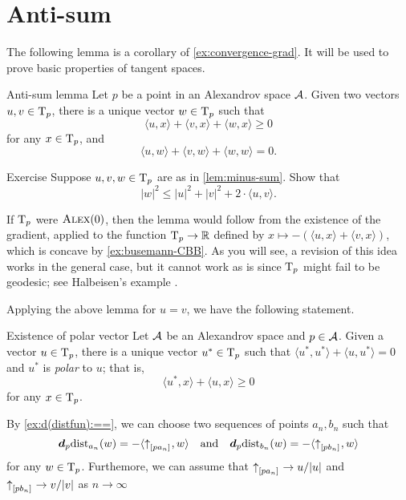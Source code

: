 \section{Anti-sum}

The following lemma is a corollary of \ref{ex:convergence-grad}.
It will be used to prove basic properties of tangent spaces.


\begin{thm}{Anti-sum lemma}\label{lem:minus-sum} 
Let $p$ be a point in an Alexandrov space $\mathcal{A}$.
Given two vectors $u,v\in \mathrm{T}_p$, there is a unique vector $w\in \mathrm{T}_p$ such that
\[\langle u,x\rangle +\langle v,x\rangle +\langle w,x\rangle \ge 0\]
for any $x\in \mathrm{T}_p$, and
\[\langle u,w\rangle +\langle v,w\rangle +\langle w,w\rangle =0.\]

\end{thm}

\begin{thm}[!]{Exercise}\label{ex:|antisum|}
Suppose $u,v, w\in \mathrm{T}_p$ are as in \ref{lem:minus-sum}.
Show that 
\[|w|^2\le |u|^2+|v|^2+2\cdot\langle u,v\rangle.\]

\end{thm}

If $\mathrm{T}_p$ were $\textsc{Alex}(0)$, then the lemma would follow from the existence  of the gradient, applied to the function $\mathrm{T}_p\to \mathbb{R}$ defined by $x\mapsto -(\langle u,x\rangle +\langle v,x\rangle )$, which is concave by \ref{ex:busemann-CBB}.
As you will see, a revision of this idea works in the general case, but it cannot work as is since $\mathrm{T}_p$ might fail to be geodesic; see Halbeisen's example \cite[13.6]{alexander-kapovitch-petrunin2024}.

Applying the above lemma for $u=v$, we have the following statement.

\begin{thm}{Existence of polar vector}\label{cor:polar}
Let $\mathcal{A}$ be an Alexandrov space 
and $p\in \mathcal{A}$. 
Given a vector $u\in \mathrm{T}_p$,  there is a unique vector $u^*\in\mathrm{T}_p$ such that $\langle u^*,u^*\rangle +\langle u,u^*\rangle = 0$ and
$u^*$ is \emph{polar} to $u$;
that is,
\[\langle u^*,x\rangle +\langle u,x\rangle \ge 0\]
for any $x\in \mathrm{T}_p$.
\end{thm}

By \ref{ex:d(distfun):==}, we can choose two sequences of points $a_n,b_n$ such that 
\[
\bm{d}_p\mathrm{dist}_{a_n}(w)=-\langle{\uparrow}_{[{p}{a_n}]_{{}}},w\rangle
\quad\text{and}\quad
\bm{d}_p\mathrm{dist}_{b_n}(w)=-\langle{\uparrow}_{[{p}{b_n}]_{{}}},w\rangle
\]
for any $w\in\mathrm{T}_p$.
Furthemore, we can assume that ${\uparrow}_{[{p}{a_n}]_{{}}}\to u/|u|$ and ${\uparrow}_{[{p}{b_n}]_{{}}}\to v/|v|$ as $n\to \infty$

